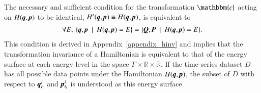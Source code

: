 \documentclass[preprint,
bibnotes,
 amsmath,amssymb,
 aps,
]{revtex4-1}
\begin{document}
The necessary and sufficient condition for the transformation $\mathbbm{c}$ acting on 
$H(\textit{\textbf{q}},\textit{\textbf{p}})$ to be identical, $H'(\textit{\textbf{q}},\textit{\textbf{p}}) \equiv H(\textit{\textbf{q}},\textit{\textbf{p}})$, is equivalent to
\begin{eqnarray}
\forall{E},\: \{\textit{\textbf{q}},\textit{\textbf{p}}\:\mid \: H(\textit{\textbf{q}},\textit{\textbf{p}}) = E\}= \{\textit{\textbf{Q}},\textit{\textbf{P}}\:\mid \:
H(\textit{\textbf{q}},\textit{\textbf{p}}) = E\}.
\label{eq_hamiltonian_condition}
\end{eqnarray}
This condition is derived in Appendix~\ref{appendix_hinv} and implies that the transformation invariance of a Hamiltonian is equivalent to that of the energy surface at each energy level in the space $\Gamma \times \mathbb{R} \times \mathbb{R}$. If the time-series dataset $D$ has all possible data points under the Hamiltonian $H(\textit{\textbf{q}},\textit{\textbf{p}})$, the subset of $D$ with respect to $\textit{\textbf{q}}_{t_i}^i$ and  $\textit{\textbf{p}}_{t_i}^i$ is understood as this energy surface.\par
\end{document}
